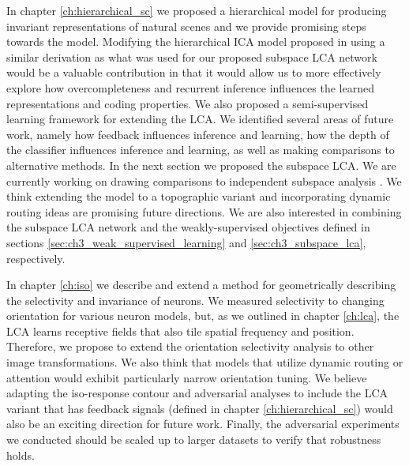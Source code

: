 In chapter \ref{ch:hierarchical_sc} we proposed a hierarchical model for producing invariant representations of natural scenes and we provide promising steps towards the model. Modifying the hierarchical ICA model proposed in \parencite{karklin2003learning} using a similar derivation as what was used for our proposed subspace LCA network would be a valuable contribution in that it would allow us to more effectively explore how overcompleteness and recurrent inference influences the learned representations and coding properties. We also proposed a semi-supervised learning framework for extending the LCA. We identified several areas of future work, namely how feedback influences inference and learning, how the depth of the classifier influences inference and learning, as well as making comparisons to alternative methods. In the next section we proposed the subspace LCA. We are currently working on drawing comparisons to independent subspace analysis \parencite{hyvarinen2000emergence}. We think extending the model to a topographic variant and incorporating dynamic routing ideas \parencite{olshausen1993neurobiological} are promising future directions. We are also interested in combining the subspace LCA network and the weakly-supervised objectives defined in sections \ref{sec:ch3_weak_supervised_learning} and \ref{sec:ch3_subspace_lca}, respectively.

In chapter \ref{ch:iso} we describe and extend a method for geometrically describing the selectivity and invariance of neurons. We measured selectivity to changing orientation for various neuron models, but, as we outlined in chapter \ref{ch:lca}, the LCA learns receptive fields that also tile spatial frequency and position. Therefore, we propose to extend the orientation selectivity analysis to other image transformations. We also think that models that utilize dynamic routing or attention would exhibit particularly narrow orientation tuning. We believe adapting the iso-response contour and adversarial analyses to include the LCA variant that has feedback signals (defined in chapter \ref{ch:hierarchical_sc}) would also be an exciting direction for future work. Finally, the adversarial experiments we conducted should be scaled up to larger datasets to verify that robustness holds.

